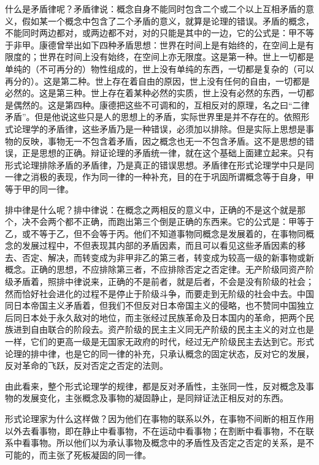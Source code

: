 \documentclass[UTF8, 12pt, a4paper]{ctexrep}
\begin{document}
什么是矛盾律呢？矛盾律说：概念自身不能同时包含二个或二个以上互相矛盾的意义，假如某一个概念中包含了二个矛盾的意义，就算是论理的错误。矛盾的概念，不能同时两边都对，或两边都不对，对的只能是其中的一边，它的公式是：甲不等于非甲。康德曾举出如下四种矛盾思想：世界在时间上是有始终的，在空间上是有限度的；世界在时间上没有始终，在空间上亦无限度。这是第一种。世上一切都是单纯的（不可再分的）物性组成的，世上没有单纯的东西，一切都是复杂的（可以再分的）。这是第二种。世上存在着自由的原因，世上没有任何的自由，一切都是必然的。这是第三种。世上存在着某种必然的实质，世上没有必然的东西，一切都是偶然的。这是第四种。康德把这些不可调和的，互相反对的原理，名之曰“二律矛盾”。但是他说这些只是人的思想上的矛盾，实际世界里是并不存在的。依照形式论理学的矛盾律，这些矛盾乃是一种错误，必须加以排除。但是实际上思想是事物的反映，事物无一不包含着矛盾，因之概念也无一不包含矛盾。这不是思想的错误，正是思想的正确。辩证论理的矛盾统一律，就在这个基础上面建立起来。只有形式论理排除矛盾的矛盾律，乃是真正的错误思想。矛盾律在形式论理学中只是同一律之消极的表现，作为同一律的一种补充，目的在于巩固所谓概念等于自身，甲等于甲的同一律。

排中律是什么呢？排中律说：在概念之两相反的意义中，正确的不是这个就是那个，决不会两个都不正确，而跑出第三个倒是正确的东西来。它的公式是：甲等于乙，或不等于乙，但不会等于丙。他们不知道事物同概念是发展着的，在事物同概念的发展过程中，不但表现其内部的矛盾因素，而且可以看见这些矛盾因素的移去、否定、解决，而转变成为非甲非乙的第三者，转变成为较高一级的新事物或新概念。正确的思想，不应排除第三者，不应排除否定之否定律。无产阶级同资产阶级矛盾着，照排中律说来，正确的不是前者，就是后者，不会是没有阶级的社会；然而恰好社会进化的过程不是停止于阶级斗争，而要走到无阶级的社会中去。中国同日本帝国主义矛盾着，但我们不但反对日本帝国主义的侵略，也不赞同中国独立后同日本处于永久敌对的地位，而主张经过民族革命及日本国内的革命，把两个民族进到自由联合的阶段去。资产阶级的民主主义同无产阶级的民主主义的对立也是一样，它们的更高一级是无国家无政府的时代，经过无产阶级民主去达到它。形式论理的排中律，也是它的同一律的补充，只承认概念的固定状态，反对它的发展，反对革命的飞跃，反对否定之否定的法则。

由此看来，整个形式论理学的规律，都是反对矛盾性，主张同一性，反对概念及事物的发展变化，主张概念及事物的凝固静止，是同辩证法正相反对的东西。

形式论理家为什么这样做？因为他们在事物的联系以外，在事物不间断的相互作用以外去看事物，即在静止中看事物，不在运动中看事物；在割断中看事物，不在联系中看事物。所以他们以为承认事物及概念中的矛盾性及否定之否定的关系，是不可能的，而主张了死板凝固的同一律。
\end{document}
